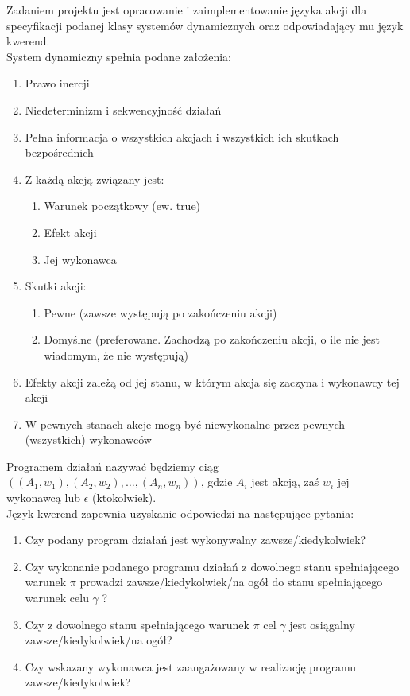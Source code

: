\documentclass{article}
\begin{document}
Zadaniem projektu jest opracowanie i zaimplementowanie języka akcji dla specyfikacji podanej klasy systemów dynamicznych oraz odpowiadający mu język kwerend.\\

System dynamiczny spełnia podane założenia:
\begin{enumerate}
\item Prawo inercji
\item Niedeterminizm i sekwencyjność działań
\item Pełna informacja o wszystkich akcjach i wszystkich ich skutkach bezpośrednich
\item Z każdą akcją związany jest:
\begin{enumerate}
\item Warunek początkowy (ew. true)
\item Efekt akcji
\item Jej wykonawca
\end{enumerate}
\item Skutki akcji:
\begin{enumerate}
\item Pewne (zawsze występują po zakończeniu akcji)
\item Domyślne (preferowane. Zachodzą po zakończeniu akcji, o ile nie jest wiadomym, że nie występują)
\end{enumerate}
\item Efekty akcji zależą od jej stanu, w którym akcja się zaczyna i wykonawcy tej akcji
\item W pewnych stanach akcje mogą być niewykonalne przez pewnych (wszystkich) wykonawców
\end{enumerate}

Programem działań nazywać będziemy ciąg $((A_{1},w_{1}), (A_{2},w_{2}), …, (A_{n},w_{n}))$, 
gdzie $A_{i}$ jest akcją, zaś $w_{i}$ jej wykonawcą lub $\epsilon$ (ktokolwiek).\\


Język kwerend zapewnia uzyskanie odpowiedzi na następujące pytania:
\begin{enumerate}
\item Czy podany program działań jest wykonywalny zawsze/kiedykolwiek?
\item Czy wykonanie podanego programu działań z dowolnego stanu spełniającego warunek $\pi$ prowadzi zawsze/kiedykolwiek/na ogół do stanu spełniającego warunek celu $\gamma$ ?
\item Czy z dowolnego stanu spełniającego warunek $\pi$ cel $\gamma$ jest osiągalny zawsze/kiedykolwiek/na ogół?
\item Czy wskazany wykonawca jest zaangażowany w realizację programu zawsze/kiedykolwiek?
\end{enumerate}
\end{document}
